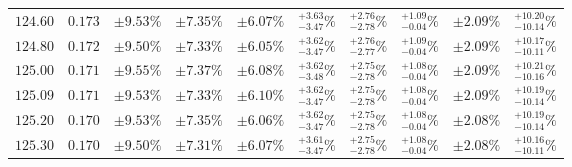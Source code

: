 \begin{table}[ht!]
{{\begin{tabular}{| cc | ccc | cccc | c |}
$124.60$ & $0.173$ & $\pm9.53\%$ & {\color{black!55}$\pm 7.35\%$} & {\color{black!55}$\pm 6.07\%$} & $^{+3.63}_{-3.47}\%$ & {\color{black!55}$^{+2.76}_{-2.78}\%$} & {\color{black!55}$^{+1.09}_{-0.04}\%$} & {\color{black!55}$\pm 2.09\%$} & $^{+10.20}_{-10.14}\%$  \\
$124.80$ & $0.172$ & $\pm9.50\%$ & {\color{black!55}$\pm 7.33\%$} & {\color{black!55}$\pm 6.05\%$} & $^{+3.62}_{-3.47}\%$ & {\color{black!55}$^{+2.76}_{-2.77}\%$} & {\color{black!55}$^{+1.09}_{-0.04}\%$} & {\color{black!55}$\pm 2.09\%$} & $^{+10.17}_{-10.11}\%$  \\
$125.00$ & $0.171$ & $\pm9.55\%$ & {\color{black!55}$\pm 7.37\%$} & {\color{black!55}$\pm 6.08\%$} & $^{+3.62}_{-3.48}\%$ & {\color{black!55}$^{+2.75}_{-2.78}\%$} & {\color{black!55}$^{+1.08}_{-0.04}\%$} & {\color{black!55}$\pm 2.09\%$} & $^{+10.21}_{-10.16}\%$  \\
$125.09$ & $0.171$ & $\pm9.53\%$ & {\color{black!55}$\pm 7.33\%$} & {\color{black!55}$\pm 6.10\%$} & $^{+3.62}_{-3.47}\%$ & {\color{black!55}$^{+2.75}_{-2.78}\%$} & {\color{black!55}$^{+1.08}_{-0.04}\%$} & {\color{black!55}$\pm 2.09\%$} & $^{+10.19}_{-10.14}\%$  \\
$125.20$ & $0.170$ & $\pm9.53\%$ & {\color{black!55}$\pm 7.35\%$} & {\color{black!55}$\pm 6.06\%$} & $^{+3.62}_{-3.47}\%$ & {\color{black!55}$^{+2.75}_{-2.78}\%$} & {\color{black!55}$^{+1.08}_{-0.04}\%$} & {\color{black!55}$\pm 2.08\%$} & $^{+10.19}_{-10.14}\%$  \\
$125.30$ & $0.170$ & $\pm9.50\%$ & {\color{black!55}$\pm 7.31\%$} & {\color{black!55}$\pm 6.07\%$} & $^{+3.61}_{-3.47}\%$ & {\color{black!55}$^{+2.75}_{-2.78}\%$} & {\color{black!55}$^{+1.08}_{-0.04}\%$} & {\color{black!55}$\pm 2.08\%$} & $^{+10.16}_{-10.11}\%$  \\

\end{tabular}}}
\end{table}
